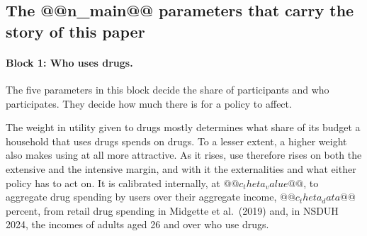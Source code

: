 \documentclass[10pt]{article}
\begin{document}
\subsection{The @@n_main@@ parameters that carry the story of this paper}\label{sec:fmainpar}



\paragraph{Block 1: Who uses drugs.}  The five parameters in this block decide the share of participants and who participates.  They decide how much there is for a policy to affect.
\begin{description}\setlength{\itemsep}{0.25em}\setlength{\parskip}{0em}
\item[$\theta$, the weight on drugs in utility.]
  The weight in utility given to drugs mostly determines what share of its budget a household that uses drugs spends on drugs. To a lesser extent, a higher weight also makes using at all more attractive. As it rises, use therefore rises on both the extensive and the intensive margin, and with it the externalities and what either policy has to act on. It is calibrated internally, at $@@c_theta_value@@$, to aggregate drug spending by users over their aggregate income, $@@c_theta_data@@$ percent, from retail drug spending in Midgette et al.\ (2019) and, in NSDUH 2024, the incomes of adults aged 26 and over who use drugs.


\end{description}
\end{document}
